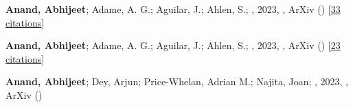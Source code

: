 \item[{\color{numcolor}\scriptsize3}] \textbf{Anand, Abhijeet}; Adame, A. G.; Aguilar, J.; Ahlen, S.; \etal, 2023, , ArXiv () [\href{https://ui.adsabs.harvard.edu/abs/2023arXiv230606308D}{33 citations}]

\item[{\color{numcolor}\scriptsize2}] \textbf{Anand, Abhijeet}; Adame, A. G.; Aguilar, J.; Ahlen, S.; \etal, 2023, , ArXiv () [\href{https://ui.adsabs.harvard.edu/abs/2023arXiv230606307D}{23 citations}]

\item[{\color{numcolor}\scriptsize1}] \textbf{Anand, Abhijeet}; Dey, Arjun; Price-Whelan, Adrian M.; Najita, Joan; \etal, 2023, , ArXiv ()
